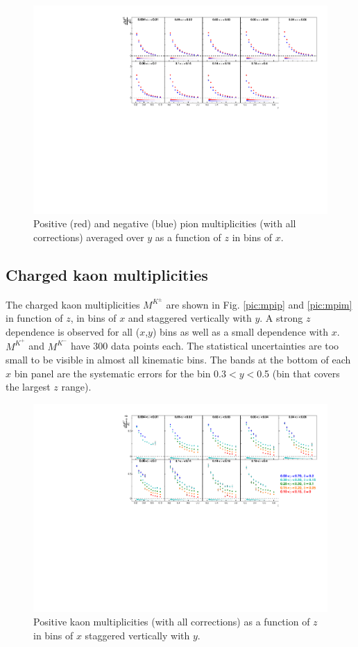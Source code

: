 \begin{figure}[!h]
  \centering
	\includegraphics[scale=0.85]{./gfx/piyavg.pdf}
	\caption{Positive (red) and negative (blue) pion multiplicities (with all corrections) averaged over $y$ as a function of $z$ in bins of $x$.}
	\label{pic:mpiyavg}
\end{figure}

\newpage

\subsection{Charged kaon multiplicities}

The charged kaon multiplicities $M^{K^{\pm}}$ are shown in Fig. \ref{pic:mpip} and \ref{pic:mpim} in function of $z$, in bins of $x$ and staggered vertically with $y$. A strong $z$ dependence is observed for all ($x$,$y$) bins as well as a small dependence with $x$. $M^{K^+}$ and $M^{K^-}$ have 300 data points each. The statistical uncertainties are too small to be visible in almost all kinematic bins. The bands at the bottom of each $x$ bin panel are the systematic errors for the bin 0.3$< y <$0.5 (bin that covers the largest $z$ range).

\begin{figure}[!h]
  \centering
	\includegraphics[scale=0.85]{./gfx/Kp.pdf}
	\caption{Positive kaon multiplicities (with all corrections) as a function of $z$ in bins of $x$ staggered vertically with $y$.}
	\label{pic:mkp}
\end{figure}

